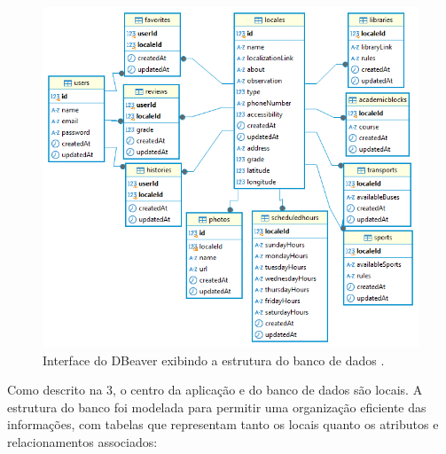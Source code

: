 \begin{figure}[h]
    \centering
    \includegraphics[width=1.1\textwidth]{imagens/encontrenaufms.png}
    \caption{\scriptsize Interface do DBeaver exibindo a estrutura do banco de dados \cite{dbeaver}.}
    \label{fig:descricaoBancoDeDados}
\end{figure}

    Como descrito na 3, o centro da aplicação e do banco de dados são locais. A estrutura do banco foi modelada para permitir uma organização eficiente das informações, com tabelas que representam tanto os locais quanto os atributos e relacionamentos associados:

